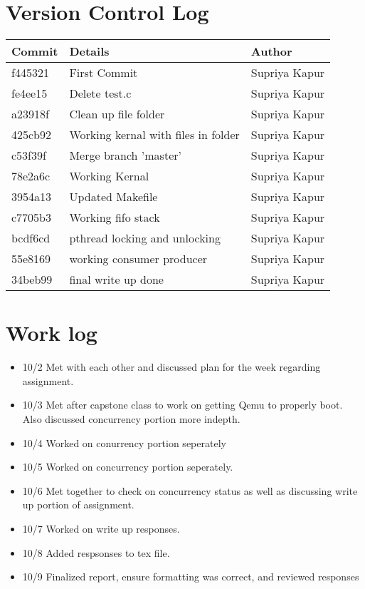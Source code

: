 \documentclass[letterpaper,onecolumn,10pt,titlepage]{IEEEtran}
\begin{document}
\section{Version Control Log}
\begin{tabular}{lll} \textbf{Commit} & \textbf{Details} & \textbf{Author}

\\ \hline
f445321&First Commit&Supriya Kapur\\ \hline
fe4ee15&Delete test.c&Supriya Kapur\\ \hline
a23918f&Clean up file folder&Supriya Kapur\\ \hline
425cb92&Working kernal with files in folder&Supriya Kapur\\ \hline
c53f39f&Merge branch 'master'&Supriya Kapur\\ \hline
78e2a6c&Working Kernal&Supriya Kapur\\ \hline
3954a13&Updated Makefile&Supriya Kapur\\ \hline
c7705b3&Working fifo stack&Supriya Kapur\\ \hline
bcdf6cd&pthread locking and unlocking&Supriya Kapur\\ \hline
55e8169&working consumer producer&Supriya Kapur\\ \hline
34beb99&final write up done&Supriya Kapur\\ \hline
\end{tabular}

\par

\section{Work log}
\par
\begin{itemize}
\item 10/2 Met with each other and discussed plan for the week regarding assignment.
\item 10/3 Met after capstone class to work on getting Qemu to properly boot. Also discussed concurrency portion more indepth.
\item 10/4 Worked on conurrency portion seperately
\item 10/5 Worked on concurrency portion seperately.
\item 10/6 Met together to check on concurrency status as well as discussing write up portion of assignment.
\item 10/7 Worked on write up responses.
\item 10/8 Added respsonses to tex file.
\item 10/9 Finalized report, ensure formatting was correct, and reviewed responses
\end{itemize}
\end{document}
